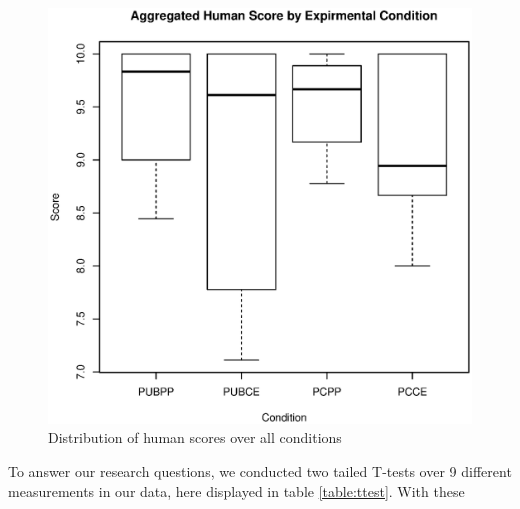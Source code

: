 \documentclass{sig-alternate-05-2015}
\begin{document}
\begin{figure}[h]
\includegraphics[width=\columnwidth]{humanBoxPlot}
\centering
\caption{Distribution of human scores over all conditions}
\label{fig:humanBoxPlot}
\end{figure}

To answer our research questions, we conducted two tailed T-tests over 9 different measurements in our data, here displayed in table \ref{table:ttest}. With these 
\end{document}
